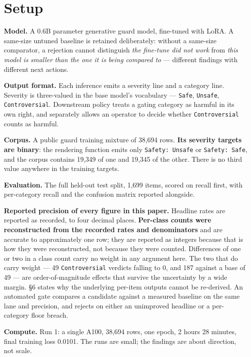 \documentclass[10pt]{article}
\begin{document}
\section{Setup}

\textbf{Model.} A 0.6B parameter generative guard model, fine-tuned with LoRA. A same-size untuned
baseline is retained deliberately: without a same-size comparator, a rejection cannot distinguish
\emph{the fine-tune did not work} from \emph{this model is smaller than the one it is being compared to} ---
different findings with different next actions.

\textbf{Output format.} Each inference emits a severity line and a category line. Severity is three-valued
in the base model's vocabulary --- \texttt{Safe}, \texttt{Unsafe}, \texttt{Controversial}. Downstream policy treats a gating
category as harmful in its own right, and separately allows an operator to decide whether
\texttt{Controversial} counts as harmful.

\textbf{Corpus.} A public guard training mixture of 38,694 rows. \textbf{Its severity targets are binary}: the
rendering function emits only \texttt{Safety:\ Unsafe} or \texttt{Safety:\ Safe}, and the corpus contains 19,349 of
one and 19,345 of the other. There is no third value anywhere in the training targets.

\textbf{Evaluation.} The full held-out test split, 1,699 items, scored on recall first, with per-category
recall and the confusion matrix reported alongside.

 \textbf{Reported precision of every figure in this paper.} Headline rates are reported as recorded, to
four decimal places. \textbf{Per-class counts were reconstructed from the recorded rates and denominators}
and are accurate to approximately one row; they are reported as integers because that is how they
were reconstructed, not because they were counted. Differences of one or two in a class count carry
no weight in any argument here. The two that do carry weight --- 49 \texttt{Controversial} verdicts falling to
0, and 187 against a base of 49 --- are order-of-magnitude effects that survive the uncertainty by a
wide margin. §6 states why the underlying per-item outputs cannot be re-derived. An automated gate compares a candidate against a
measured baseline on the same lane and precision, and rejects on either an unimproved headline or a
per-category floor breach.

\textbf{Compute.} Run 1: a single A100, 38,694 rows, one epoch, 2 hours 28 minutes, final training loss
0.0101. The runs are small; the findings are about direction, not scale.
\end{document}
